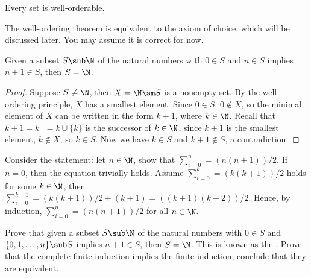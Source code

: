 \documentclass[10pt]{article}
\begin{document}
\begin{theorem}
    Every set is well-orderable.
\end{theorem}
\par
The well-ordering theorem is equivalent to the axiom of choice, which will be discussed later. You may assume it is correct for now. 
\begin{theorem}
    Given a subset $S\sub\N$ of the natural numbers with $0\in S$ and $n\in S$ implies $n+1\in S$, then $S=\N$.
\end{theorem}
\begin{proof}
    Suppose $S\ne\N$, then $X=\N\sm S$ is a nonempty set. By the well-ordering principle, $X$ has a smallest element. Since $0\in S$, $0\notin X$, so the minimal element of $X$ can be written in the form $k+1$, where $k\in\N$. Recall that $k+1={k}^{+}=k\cup\{k\}$ is the successor of $k\in\N$, since $k+1$ is the smallest element, $k\notin X$, so $k\in S$. Now we have $k\in S$ and $k+1\notin S$, a contradiction.
\end{proof}
\begin{example}
    Consider the statement: let $n\in\N$, show that ${\sum}_{i=0}^{n}=(n(n+1))/2$. If $n=0$, then the equation trivially holds. Assume ${\sum}_{i=0}^{k}=(k(k+1))/2$ holds for some $k\in\N$, then ${\sum}_{i=0}^{k+1}=(k(k+1))/2+(k+1)=((k+1)(k+2))/2$. Hence, by induction, ${\sum}_{i=0}^{n}=(n(n+1))/2$ for all $n\in\N$.
\end{example}
\begin{problem}
    Prove that given a subset $S\sub\N$ of the natural numbers with $0\in S$ and $\{0,1,\dots,n\}\sub S$ implies $n+1\in S$, then $S=\N$. This is known as the . Prove that the complete finite induction implies the finite induction, conclude that they are equivalent.
\end{problem}
\end{document}
